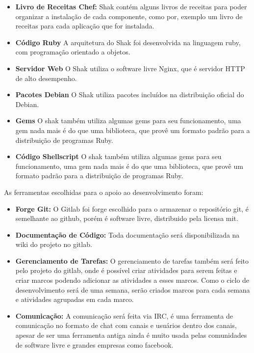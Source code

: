 \begin{itemize}
  \item  \textbf{Livro de Receitas Chef:} Shak contém alguns livros de receitas
  para poder organizar a instalação de cada componente, como por, exemplo um livro
  de receitas para cada aplicação que for instalada.
  \item  \textbf{Código Ruby} A arquitetura do Shak foi desenvolvida na linguagem
  ruby, com programação orientado a objetos.
  \item  \textbf{Servidor Web} O Shak utiliza o software livre Nginx, que é
  servidor HTTP de alto desempenho\cite{nginx}.
  \item  \textbf{Pacotes Debian} O Shak utiliza pacotes incluídos na distribuição
  oficial do Debian.
  \item  \textbf{Gems} O shak também utiliza algumas gems para seu funcionamento,
  uma gem nada mais é do que uma biblioteca, que provê um formato padrão para
  a distribuição de programas Ruby\cite{gem}.
  \item  \textbf{Código Shellscript} O shak também utiliza algumas gems para seu funcionamento,
  uma gem nada mais é do que uma biblioteca, que provê um formato padrão para
  a distribuição de programas Ruby\cite{gem}.
\end{itemize}

As ferramentas escolhidas para o apoio ao desenvolvimento foram:
\begin{itemize}
  \item \textbf{Forge Git:} O Gitlab foi forge escolhido para o armazenar o
  repositório git, é semelhante ao github, porém é software livre, distribuido pela
  licensa mit\cite{gitlab}.
  \item \textbf{Documentação de Código:} Toda documentação será disponibilizada
  na wiki do projeto no gitlab.
  \item \textbf{Gerenciamento de Tarefas:} O gerenciamento de tarefas também será
  feito pelo projeto do gitlab, onde é possível criar atividades para serem feitas
  e criar marcos podendo adicionar as atividades a esses marcos. Como o ciclo de
  desenvolvimento será de uma semana, serão criados marcos para cada semana e atividades
  agrupadas em cada marco.
  \item \textbf{Comunicação:} A comunicação será feita via IRC, é uma ferramenta
  de comunicação no formato de chat com canais e usuários dentro dos canais,
  apesar de ser uma ferramenta antiga ainda é muito usada pelas comunidades de software
  livre e grandes empresas como facebook\cite{artigofacebook}.
\end{itemize}

